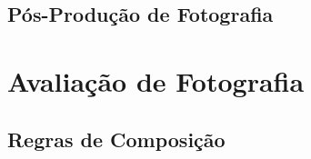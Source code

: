 \subsection{Pós-Produção de Fotografia}
\label{sub:foto_post_prod}



\section{Avaliação de Fotografia}
\label{sec:foto_eval}

\subsection{Regras de Composição}
\label{sub:foto_rules}
